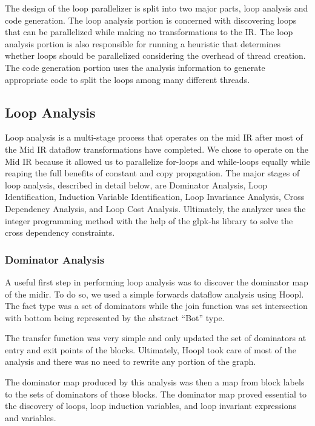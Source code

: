 \documentclass[11pt]{article}
\begin{document}
The design of the loop parallelizer is split into two major parts,
loop analysis and code generation. The loop analysis portion is
concerned with discovering loops that can be parallelized while making
no transformations to the IR. The loop analysis portion is also
responsible for running a heuristic that determines whether loops
should be parallelized considering the overhead of thread
creation. The code generation portion uses the analysis information to 
generate appropriate code to split the loops among many different
threads.

\subsection { Loop Analysis } 

Loop analysis is a multi-stage process that operates on the mid IR
after most of the Mid IR dataflow transformations have completed. We
chose to operate on the Mid IR because it allowed us to parallelize
for-loops and while-loops equally while reaping the full benefits of
constant and copy propagation. The major stages of loop analysis,
described in detail below, are Dominator Analysis, Loop
Identification, Induction Variable Identification, Loop Invariance
Analysis, Cross Dependency Analysis, and Loop Cost
Analysis. Ultimately, the analyzer uses the integer programming method
with the help of the glpk-hs library to solve the cross dependency
constraints.

\subsubsection {Dominator Analysis} 

A useful first step in performing loop analysis was to discover the
dominator map of the midir. To do so, we used a simple forwards
dataflow analysis using Hoopl. The fact type was a set of dominators
while the join function was set intersection with bottom being
represented by the abstract ``Bot'' type. 

The transfer function was very simple and only updated the set of
dominators at entry and exit points of the blocks. Ultimately, Hoopl
took care of most of the analysis and there was no need to rewrite any
portion of the graph. 

The dominator map produced by this analysis was then a map from
block labels to the sets of dominators of those blocks. The dominator
map proved essential to the discovery of loops, loop induction
variables, and loop invariant expressions and variables. 
\end{document}
